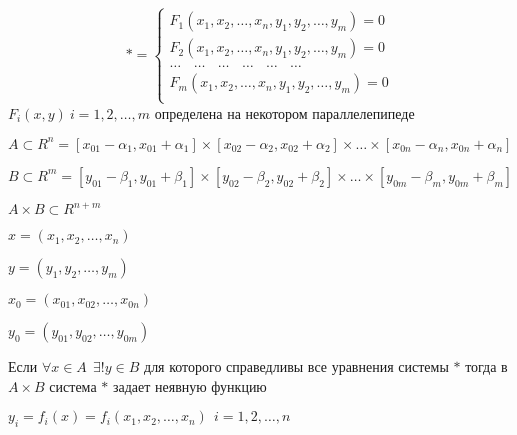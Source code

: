 \begin{define}
  $$
  * =
  \left\{
  \begin{array}{l}
    F_1(x_1, x_2, \ldots, x_n, y_1, y_2, \ldots, y_m) = 0 \\
    F_2(x_1, x_2, \ldots, x_n, y_1, y_2, \ldots, y_m) = 0 \\
    \ldots ~~~~ \ldots ~~~~ \ldots ~~~~ \ldots ~~~~ \ldots ~~~~ \ldots\\
    F_m(x_1, x_2, \ldots, x_n, y_1, y_2, \ldots, y_m) = 0 \\
  \end{array}
  \right.
  $$
  $F_i (x, y) ~ i = 1,2, \ldots, m$ определена на некотором параллелепипеде

  $A \subset R^n =
  [x_{01} - \alpha_1, x_{01} + \alpha_1] \times
  [x_{02} - \alpha_2, x_{02} + \alpha_2] \times \ldots \times
  [x_{0n} - \alpha_n, x_{0n} + \alpha_n]$

  $B \subset R^m =
  [y_{01} - \beta_1, y_{01} + \beta_1] \times
  [y_{02} - \beta_2, y_{02} + \beta_2] \times \ldots \times
  [y_{0m} - \beta_m, y_{0m} + \beta_m]$

  $A \times B \subset R^{n+m}$

  $x = (x_1, x_2, \ldots, x_n)$

  $y = (y_1, y_2, \ldots, y_m)$

  $x_0 = (x_{01}, x_{02}, \ldots, x_{0n})$

  $y_0 = (y_{01}, y_{02}, \ldots, y_{0m})$

  Если $\forall x \in A ~~ \exists! y \in B$ для которого справедливы все
  уравнения системы $*$ тогда в $A \times B$ система $*$ задает неявную функцию

  $y_i = f_i(x) = f_i(x_1, x_2, \ldots, x_n) ~~ i = 1, 2, \ldots, n$
\end{define}

